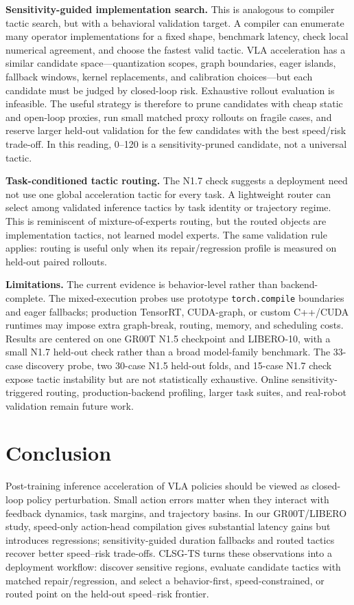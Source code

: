 \documentclass[letterpaper,10pt,twocolumn]{article}
\begin{document}
\textbf{Sensitivity-guided implementation search.}
This is analogous to compiler tactic search, but with a behavioral validation target. A compiler can enumerate many operator implementations for a fixed shape, benchmark latency, check local numerical agreement, and choose the fastest valid tactic. VLA acceleration has a similar candidate space---quantization scopes, graph boundaries, eager islands, fallback windows, kernel replacements, and calibration choices---but each candidate must be judged by closed-loop risk. Exhaustive rollout evaluation is infeasible. The useful strategy is therefore to prune candidates with cheap static and open-loop proxies, run small matched proxy rollouts on fragile cases, and reserve larger held-out validation for the few candidates with the best speed/risk trade-off. In this reading, 0--120 is a sensitivity-pruned candidate, not a universal tactic.

\textbf{Task-conditioned tactic routing.}
The N1.7 check suggests a deployment need not use one global acceleration tactic for every task. A lightweight router can select among validated inference tactics by task identity or trajectory regime. This is reminiscent of mixture-of-experts routing, but the routed objects are implementation tactics, not learned model experts. The same validation rule applies: routing is useful only when its repair/regression profile is measured on held-out paired rollouts.

\textbf{Limitations.}
The current evidence is behavior-level rather than backend-complete. The mixed-execution probes use prototype \texttt{torch.compile} boundaries and eager fallbacks; production TensorRT, CUDA-graph, or custom C++/CUDA runtimes may impose extra graph-break, routing, memory, and scheduling costs. Results are centered on one GR00T N1.5 checkpoint and LIBERO-10, with a small N1.7 held-out check rather than a broad model-family benchmark. The 33-case discovery probe, two 30-case N1.5 held-out folds, and 15-case N1.7 check expose tactic instability but are not statistically exhaustive. Online sensitivity-triggered routing, production-backend profiling, larger task suites, and real-robot validation remain future work.

\section{Conclusion}

Post-training inference acceleration of VLA policies should be viewed as closed-loop policy perturbation. Small action errors matter when they interact with feedback dynamics, task margins, and trajectory basins. In our GR00T/LIBERO study, speed-only action-head compilation gives substantial latency gains but introduces regressions; sensitivity-guided duration fallbacks and routed tactics recover better speed--risk trade-offs. CLSG-TS turns these observations into a deployment workflow: discover sensitive regions, evaluate candidate tactics with matched repair/regression, and select a behavior-first, speed-constrained, or routed point on the held-out speed--risk frontier.
\end{document}
